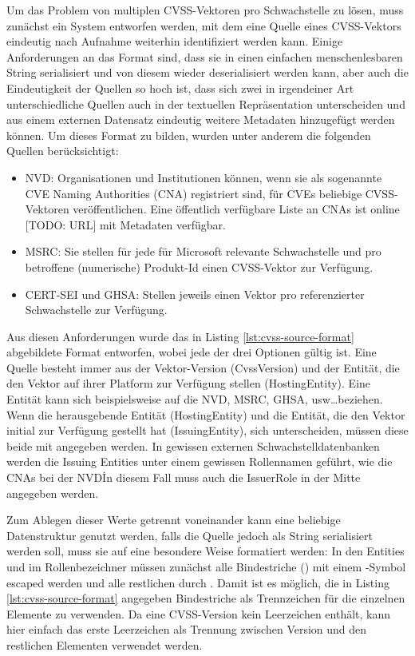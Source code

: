 Um das Problem von multiplen CVSS-Vektoren pro Schwachstelle zu lösen, muss zunächst ein System entworfen werden, mit dem eine Quelle eines CVSS-Vektors eindeutig nach Aufnahme weiterhin identifiziert werden kann.
Einige Anforderungen an das Format sind, dass sie in einen einfachen menschenlesbaren String serialisiert und von diesem wieder deserialisiert werden kann, aber auch die Eindeutigkeit der Quellen so hoch ist, dass sich zwei in irgendeiner Art unterschiedliche Quellen auch in der textuellen Repräsentation unterscheiden und aus einem externen Datensatz eindeutig weitere Metadaten hinzugefügt werden können.
Um dieses Format zu bilden, wurden unter anderem die folgenden Quellen berücksichtigt:

\begin{itemize}
    \item NVD:
    Organisationen und Institutionen können, wenn sie als sogenannte CVE Naming Authorities (CNA) registriert sind, für CVEs beliebige CVSS-Vektoren veröffentlichen.
    Eine öffentlich verfügbare Liste an CNAs ist online [TODO: URL] mit Metadaten verfügbar.
    \item MSRC:
    Sie stellen für jede für Microsoft relevante Schwachstelle und pro betroffene (numerische) Produkt-Id einen CVSS-Vektor zur Verfügung.
    \item CERT-SEI und GHSA: Stellen jeweils einen Vektor pro referenzierter Schwachstelle zur Verfügung.
\end{itemize}

Aus diesen Anforderungen wurde das in Listing \ref{lst:cvss-source-format} abgebildete Format entworfen, wobei jede der drei Optionen gültig ist.
Eine Quelle besteht immer aus der Vektor-Version (CvssVersion) und der Entität, die den Vektor auf ihrer Platform zur Verfügung stellen (HostingEntity).
Eine Entität kann sich beispielsweise auf die NVD, MSRC, GHSA, usw\ldots beziehen.
Wenn die herausgebende Entität (HostingEntity) und die Entität, die den Vektor initial zur Verfügung gestellt hat (IssuingEntity), sich unterscheiden, müssen diese beide mit angegeben werden.
In gewissen externen Schwachstelldatenbanken werden die Issuing Entities unter einem gewissen Rollennamen geführt, wie die CNAs bei der NVD\.
In diesem Fall muss auch die IssuerRole in der Mitte angegeben werden.

Zum Ablegen dieser Werte getrennt voneinander kann eine beliebige Datenstruktur genutzt werden, falls die Quelle jedoch als String serialisiert werden soll, muss sie auf eine besondere Weise formatiert werden:
In den Entities und im Rollenbezeichner müssen zunächst alle Bindestriche (\qt{-}) mit einem \qt{\\}-Symbol escaped werden und alle restlichen \qt{\\} durch \qt{\\\\}.
Damit ist es möglich, die in Listing \ref{lst:cvss-source-format} angegeben Bindestriche als Trennzeichen für die einzelnen Elemente zu verwenden.
Da eine CVSS-Version kein Leerzeichen enthält, kann hier einfach das erste Leerzeichen als Trennung zwischen Version und den restlichen Elementen verwendet werden.

